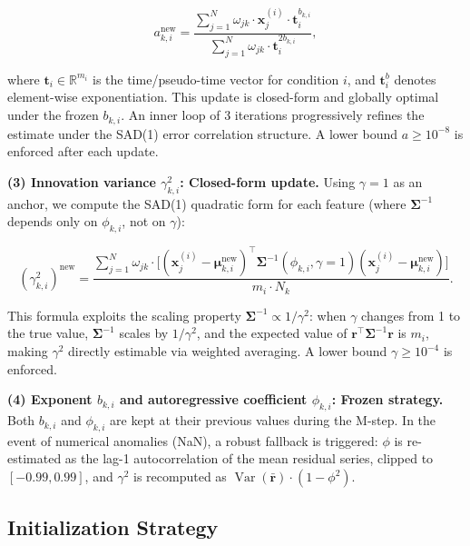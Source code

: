 \documentclass[12pt,a4paper]{article}
\DeclareMathOperator{\var}{Var}
\begin{document}
\begin{equation}\label{eq:a_update}
    a_{k,i}^{\text{new}} =
    \frac{\sum_{j=1}^{N} \omega_{jk} \cdot \bm{x}_j^{(i)} \cdot \bm{t}_i^{b_{k,i}}}
         {\sum_{j=1}^{N} \omega_{jk} \cdot \bm{t}_i^{2b_{k,i}}},
\end{equation}

where $\bm{t}_i \in \mathbb{R}^{m_i}$ is the time/pseudo-time vector for condition $i$, and $\bm{t}_i^{b}$ denotes element-wise exponentiation. This update is closed-form and globally optimal under the frozen $b_{k,i}$. An inner loop of 3 iterations progressively refines the estimate under the SAD(1) error correlation structure. A lower bound $a \geq 10^{-8}$ is enforced after each update.

\textbf{(3) Innovation variance $\gamma_{k,i}^2$: Closed-form update.} Using $\gamma = 1$ as an anchor, we compute the SAD(1) quadratic form for each feature (where $\bm{\Sigma}^{-1}$ depends only on $\phi_{k,i}$, not on $\gamma$):

\begin{equation}\label{eq:gamma_update}
    (\gamma_{k,i}^2)^{\text{new}} =
    \frac{\sum_{j=1}^{N} \omega_{jk} \cdot
        \bigl[ (\bm{x}_j^{(i)} - \bm{\mu}_{k,i}^{\text{new}})^\top
               \bm{\Sigma}^{-1}(\phi_{k,i}, \gamma=1)
               (\bm{x}_j^{(i)} - \bm{\mu}_{k,i}^{\text{new}}) \bigr]}
         {m_i \cdot N_k}.
\end{equation}

This formula exploits the scaling property $\bm{\Sigma}^{-1} \propto 1/\gamma^2$: when $\gamma$ changes from 1 to the true value, $\bm{\Sigma}^{-1}$ scales by $1/\gamma^2$, and the expected value of $\bm{r}^\top \bm{\Sigma}^{-1} \bm{r}$ is $m_i$, making $\gamma^2$ directly estimable via weighted averaging. A lower bound $\gamma \geq 10^{-4}$ is enforced.

\textbf{(4) Exponent $b_{k,i}$ and autoregressive coefficient $\phi_{k,i}$: Frozen strategy.} Both $b_{k,i}$ and $\phi_{k,i}$ are kept at their previous values during the M-step. In the event of numerical anomalies (NaN), a robust fallback is triggered: $\phi$ is re-estimated as the lag-1 autocorrelation of the mean residual series, clipped to $[-0.99, 0.99]$, and $\gamma^2$ is recomputed as $\var(\bar{\bm{r}}) \cdot (1 - \phi^2)$.

\subsection{Initialization Strategy}
\end{document}
